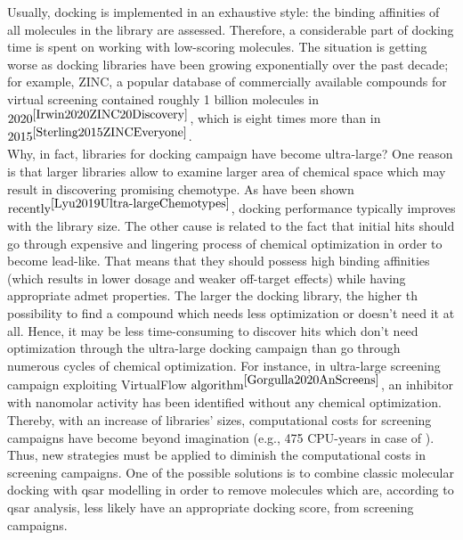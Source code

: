 
Usually, docking is implemented in an exhaustive style: the binding affinities of all molecules in the library are assessed.
Therefore, a considerable part of docking time is spent on working with low-scoring molecules.
The situation is getting worse as docking libraries have been growing exponentially over the past decade; for example, ZINC, a popular database of commercially available compounds for virtual screening contained roughly 1 billion molecules in $2020^{\cite{Irwin2020ZINC20Discovery}}$, which is eight times more than in $2015^{\cite{Sterling2015ZINCEveryone}}$.\\

Why, in fact, libraries for docking campaign have become ultra-large?
One reason is that larger libraries allow to examine larger area of chemical space which may result in discovering promising chemotype. 
As have been shown $\text{recently}^{\cite{Lyu2019Ultra-largeChemotypes}}$, docking performance typically improves with the library size.  
The other cause is related to the fact that initial hits should go through expensive and lingering process of chemical optimization in order to become lead-like.
That means that they should possess high binding affinities (which results in lower dosage and weaker off-target effects) while having appropriate \acrshort{admet} properties.
The larger the docking library, the higher th possibility to find a compound which needs less optimization or doesn't need it at all.
Hence, it may be less time-consuming to discover hits which don't need optimization through the ultra-large docking campaign than go through numerous cycles of chemical optimization.
For instance, in ultra-large screening campaign exploiting VirtualFlow $\text{algorithm}^{\cite{Gorgulla2020AnScreens}}$, an inhibitor with nanomolar activity has been identified without any chemical optimization.\\

Thereby, with an increase of libraries' sizes, computational costs for screening campaigns have become beyond imagination (e.g.,  475 CPU-years in case of \cite{Gorgulla2020AnScreens}).
Thus, new strategies must be applied to diminish the computational costs in screening campaigns.
One of the possible solutions is to combine classic molecular docking with \acrshort{qsar} modelling in order to remove molecules which are, according to \acrshort{qsar} analysis, less likely have an appropriate docking score, from screening campaigns.\\

